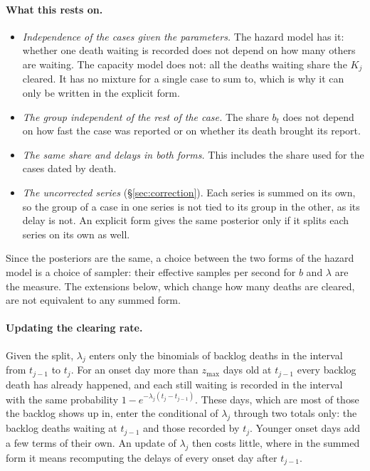 \documentclass[11pt,a4paper]{article}
\begin{document}
\paragraph{What this rests on.}
\begin{itemize}
\item \emph{Independence of the cases given the parameters.} The hazard
model has it: whether one death waiting is recorded does not depend on how
many others are waiting. The capacity model does not: all the deaths waiting
share the $K_j$ cleared. It has no mixture for a single case to sum to,
which is why it can only be written in the explicit form.
\item \emph{The group independent of the rest of the case.} The share $b_t$
does not depend on how fast the case was reported or on whether its death
brought its report.
\item \emph{The same share and delays in both forms.} This includes the share
used for the cases dated by death.
\item \emph{The uncorrected series} (\S\ref{sec:correction}). Each series is summed on its own, so the group of a
case in one series is not tied to its group in the other, as its delay is
not. An explicit form gives the same posterior only if it splits each
series on its own as well.
\end{itemize}
Since the posteriors are the same, a choice between the two forms of the
hazard model is a choice of sampler: their effective samples per second for
$b$ and $\lambda$ are the measure. The extensions below, which change how
many deaths are cleared, are not equivalent to any summed form.

\paragraph{Updating the clearing rate.} Given the split, $\lambda_j$ enters
only the binomials of backlog deaths in the interval from $t_{j-1}$ to
$t_j$. For an onset day more than $z_{\max}$ days old at $t_{j-1}$ every
backlog death has already happened, and each still waiting is recorded in
the interval with the same probability $1-e^{-\lambda_j(t_j-t_{j-1})}$. These
days, which are most of those the backlog shows up in, enter the conditional
of $\lambda_j$ through two totals only: the backlog deaths waiting at
$t_{j-1}$ and those recorded by $t_j$. Younger onset days add a few terms of
their own. An update of $\lambda_j$ then costs little, where in the summed
form it means recomputing the delays of every onset day after $t_{j-1}$.
\end{document}

